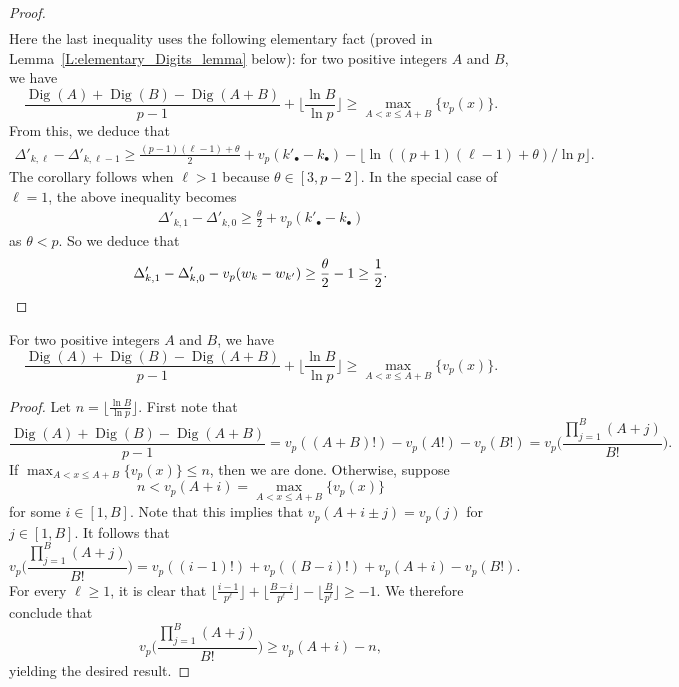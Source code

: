 \begin{proof}
\begin{align*}
    \end{align*}
    Here the last inequality uses the following elementary fact (proved in Lemma~\ref{L:elementary_Digits_lemma} below): for two positive integers $A$ and $B$, we have
    $$
    \frac{{\operatorname{Dig}}(A) + {\operatorname{Dig}}(B) -{\operatorname{Dig}}(A+B)}{p-1} +\Big\lfloor \frac{\ln B}{\ln p}\Big\rfloor \geq \max_{A<x\leq A+B}\big\{v_p(x)\big\}.
    $$
    From this, we deduce that
    \begin{align*}
    \Delta'_{k, \ell} - \Delta'_{k,\ell-1} \geq\tfrac {(p-1) (\ell-1) + \theta}2 +v_p(k'_\bullet - k_\bullet)  - \big\lfloor \ln((p+1)(\ell-1)+\theta) / \ln p\big\rfloor.
    \end{align*}
    The corollary follows when $\ell >1$ because $\theta \in [3,p-2]$.
    In the special case of $\ell=1$, the above inequality becomes
    \begin{align*}
    \Delta'_{k,1} - \Delta'_{k,0}\geq \frac \theta 2+v_p(k'_\bullet - k_\bullet)
    \end{align*}
    as $\theta<p$. So we deduce that
    \[
    \Delta'_{k,1}-\Delta'_{k,0}-v_p(w_{k} - w_{k'})\geq \frac \theta 2 - 1 \geq \frac 12. \qedhere
    \]
\end{proof}

\begin{lemma}
    \label{L:elementary_Digits_lemma}
    For two positive integers $A$ and $B$, we have
    	\[
    	\frac{{\operatorname{Dig}}(A)+{\operatorname{Dig}}(B)-{\operatorname{Dig}}(A+B)}{p-1}+\Big\lfloor \frac{\ln B}{\ln p}\Big\rfloor\geq \max_{A<x\leq A+B}\{ v_p(x) \}.
    	\]
\end{lemma}

\begin{proof}
    Let $n=\lfloor \frac{\ln B}{\ln p}\rfloor$. First note that
    \[
    	\frac{{\operatorname{Dig}}(A)+{\operatorname{Dig}}(B)-{\operatorname{Dig}}(A+B)}{p-1}=v_p((A+B)!)-v_p(A!)-v_p(B!)=v_p\Big(\frac{\prod_{j=1}^B (A+j)}{B!} \Big).
    	\]
    If $\max_{A<x\leq A+B}\{ v_p(x) \}\leq n$, then we are done. Otherwise, suppose
    \[
    n<v_p(A+i)=\max_{A<x\leq A+B}\{ v_p(x)\}
    \]
    for some $i\in [1, B]$. Note that this implies that $v_p(A+i\pm j)=v_p(j)$ for $j\in[1, B]$. It follows that
    \[
    v_p\Big(\frac{\prod_{j=1}^B (A+j)}{B!} \Big)=v_p((i-1)!)+v_p((B-i)!)+v_p(A+i)-v_p(B!).
    \]
    For every $\ell\geq1$, it is clear that $\lfloor \frac{i-1}{p^\ell}\rfloor+\lfloor \frac{B-i}{p^\ell}\rfloor-\lfloor \frac{B}{p^\ell}\rfloor\geq-1$. We therefore conclude that
    \[
    v_p\Big(\frac{\prod_{j=1}^B (A+j)}{B!} \Big)\geq v_p(A+i)-n,
    \]
    yielding the desired result.
\end{proof}

